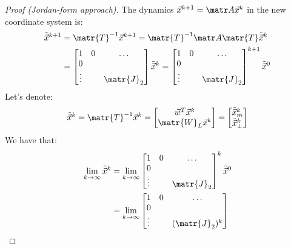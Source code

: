 \begin{subappendices}
\begin{theorem}
\begin{proof}[Proof (Jordan-form approach)]
        The dynamics $\x^{k+1} = \A \x^k$ in the new coordinate system is:
        \[
            \begin{split}
                \tilde{\x}^{k+1} &= \matr{T}^{-1} \x^{k+1} = \matr{T}^{-1} \A \matr{T} \tilde{\x}^k \\
                &= \begin{bmatrix}
                    1 & 0 & \dots \\
                    0 & & \\
                    \vdots & & \matr{J}_2 \\
                \end{bmatrix} \tilde{\x}^k
                = \begin{bmatrix}
                    1 & 0 & \dots \\
                    0 & & \\
                    \vdots & & \matr{J}_2 \\
                \end{bmatrix}^{k+1} \tilde{\x}^0
            \end{split}
        \]
        Let's denote:
        \[
            \tilde{\x}^k = \matr{T}^{-1}\x^k = \begin{bmatrix}
                \w^T\x^k \\ \matr{W}_L\x^k
            \end{bmatrix}
            = \begin{bmatrix}
                \tilde{\x}^k_{m} \\ \tilde{\x}^k_{\bot}
            \end{bmatrix}
        \]
        We have that:
        \[
            \begin{split}
                \lim_{k \rightarrow \infty} \tilde{\x}^k
                &= \lim_{k \rightarrow \infty} \begin{bmatrix}
                    1 & 0 & \dots \\
                    0 & & \\
                    \vdots & & \matr{J}_2 \\
                \end{bmatrix}^k \tilde{\x}^0 \\
                &= \lim_{k \rightarrow \infty} \begin{bmatrix}
                    1 & 0 & \dots \\
                    0 & & \\
                    \vdots & & (\matr{J}_2)^k \\

\end{bmatrix}
\end{split}\]
\end{proof}
\end{theorem}
\end{subappendices}
